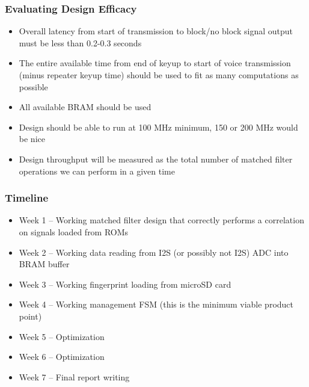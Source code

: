 \documentclass{beamer}
\begin{document}
    \begin{frame}
        \frametitle{Evaluating Design Efficacy}

        \begin{itemize}
            \item Overall latency from start of transmission to block/no block signal output must be less than 0.2-0.3 seconds

            \item The entire available time from end of keyup to start of voice transmission (minus repeater keyup time) should be used to fit as many computations as possible

            \item All available BRAM should be used

            \item Design should be able to run at 100 MHz minimum, 150 or 200 MHz would be nice

            \item Design throughput will be measured as the total number of matched filter operations we can perform in a given time
        \end{itemize}
    \end{frame}

    \begin{frame}
        \frametitle{Timeline}

        \begin{itemize}
            \item Week 1 -- Working matched filter design that correctly performs a correlation on signals loaded from ROMs
            \item Week 2 -- Working data reading from I2S (or possibly not I2S) ADC into BRAM buffer
            \item Week 3 -- Working fingerprint loading from microSD card
            \item Week 4 -- Working management FSM (this is the minimum viable product point)
            \item Week 5 -- Optimization
            \item Week 6 -- Optimization
            \item Week 7 -- Final report writing
        \end{itemize}
    \end{frame}
\end{document}
